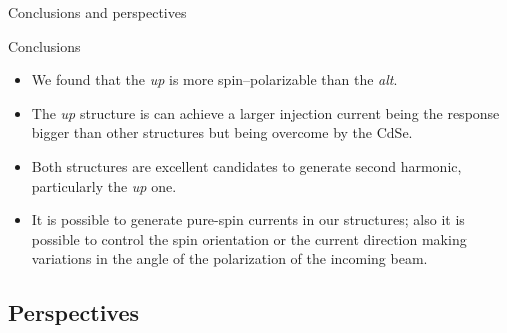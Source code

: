 \documentclass{beamer}
\begin{document}
\begin{frame}

\vspace{-0.7cm}

\noindent\makebox[\linewidth]{\rule{\linewidth}{0.4pt}}

\vspace{-2.0mm}
\begin{center}
{\large Conclusions and perspectives}
\end{center}

\vspace{-6mm}
\noindent\makebox[\linewidth]{\rule{\linewidth}{0.4pt}}

\vspace{2mm}

Conclusions
{\small

\begin{itemize}

\item 
We found that the \emph{up} is more spin--polarizable than the \emph{alt}.

\item 
The \emph{up} structure is can achieve a larger injection current being the
response bigger than other structures but being overcome by the CdSe.

\item 
Both structures are excellent candidates to generate second harmonic,
particularly the \emph{up} one.

\item 
It is possible to generate pure-spin currents in our structures; also it is
possible to control the spin orientation or the current direction making
variations in the angle of the polarization of the incoming beam.

\end{itemize}
}

\end{frame}



\subsection{Perspectives}
\end{document}
